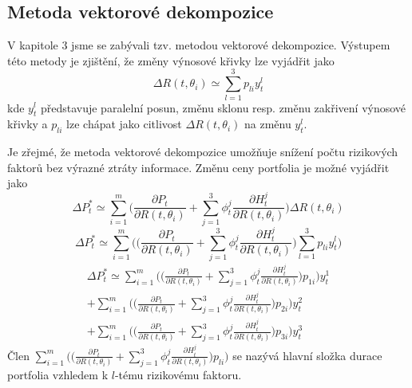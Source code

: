 \documentclass[a4paper]{book}
\begin{document}
\subsection{Metoda vektorové dekompozice}

V kapitole 3 jsme se zabývali tzv. metodou vektorové dekompozice. Výstupem této metody je zjištění, že změny výnosové křivky lze vyjádřit jako
\begin{equation*}
\Delta R(t, \theta_i) \simeq \sum_{l = 1}^3 p_{li}y_t^l
\end{equation*}
kde $y_t^l$ představuje paralelní posun, změnu sklonu resp. změnu zakřivení výnosové křivky a $p_{li}$ lze chápat jako citlivost $\Delta R(t, \theta_i)$ na změnu $y_t^l$.

Je zřejmé, že metoda vektorové dekompozice umožňuje snížení počtu rizikových faktorů bez výrazné ztráty informace. Změnu ceny portfolia je možné vyjádřit jako
\begin{equation*}
\Delta P_t^* \simeq \sum_{i=1}^m \Bigg( \frac{\partial P_t}{\partial R(t,\theta_i)} + \sum_{j=1}^3 \phi_t^j \frac{\partial H_t^j}{\partial R(t, \theta_i)}\Bigg)\Delta R(t, \theta_i)
\end{equation*}
\begin{equation*}
\Delta P_t^* \simeq \sum_{i=1}^m \Bigg( \Bigg( \frac{\partial P_t}{\partial R(t,\theta_i)} + \sum_{j=1}^3 \phi_t^j \frac{\partial H_t^j}{\partial R(t, \theta_i)}\Bigg)\sum_{l=1}^3 p_{li}y_t^l \Bigg)
\end{equation*}
\begin{equation*}
\begin{split}
\Delta P_t^* \simeq \sum_{i=1}^m \Bigg( \Bigg(\frac{\partial P_t}{\partial R(t,\theta_i)} + \sum_{j=1}^3 \phi_t^j \frac{\partial H_t^j}{\partial R(t, \theta_i)}\Bigg)p_{1i}\Bigg)y_t^1\\
+ \sum_{i=1}^m \Bigg( \Bigg( \frac{\partial P_t}{\partial R(t,\theta_i)} + \sum_{j=1}^3 \phi_t^j \frac{\partial H_t^j}{\partial R(t, \theta_i)}\Bigg)p_{2i}\Bigg)y_t^2\\
+ \sum_{i=1}^m \Bigg( \Bigg( \frac{\partial P_t}{\partial R(t,\theta_i)} + \sum_{j=1}^3 \phi_t^j \frac{\partial H_t^j}{\partial R(t, \theta_i)}\Bigg)p_{3i}\Bigg)y_t^3
\end{split}
\end{equation*}
Člen $\sum_{i=1}^m\Big(\Big(\frac{\partial P_t}{\partial R(t, \theta_i)} + \sum_{j=1}^3 \phi_t^j \frac{\partial H_t^j}{\partial R(t, \theta_i)}\Big) p_{li}\Big)$ se nazývá hlavní složka durace portfolia vzhledem k $l$-tému rizikovému faktoru.
\end{document}

